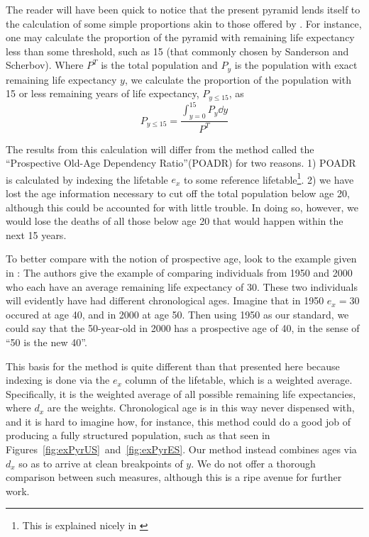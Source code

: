 \FloatBarrier
\label{sec:exageing}
The reader will have been quick to notice that the present pyramid lends itself
to the calculation of some simple proportions akin to those offered by
\citet[e.g.][]{sanderson2005average}. For instance, one may calculate the
proportion of the pyramid with remaining life expectancy less than some
threshold, such as 15 (that commonly chosen by Sanderson and Scherbov). Where
$P^T$ is the total population and $P_y$ is the population with exact remaining
life expectancy $y$, we calculate the proportion of the population with 15 or
less remaining years of life expectancy, $P_{y \le 15}$, as
\begin{equation}
P_{y \le 15} = \frac{\int _{y=0}^{15} P_y \dd y}{P^T}
\end{equation}

The results from this calculation will differ from the method called the
``Prospective Old-Age Dependency Ratio''(POADR) for two reasons. 1) POADR is
calculated by indexing the lifetable $e_x$ to some reference
lifetable\footnote{This is explained nicely in \citet{sanderson2007new}}. 2)
we have lost the age information necessary to cut off the total population
below age 20, although this could be accounted for with little trouble. In
doing so, however, we would lose the deaths of all those below age 20 that
would happen within the next 15 years. 

To better compare with the notion of prospective age, look to the example given
in \citet{sanderson2007new}: The authors give the example of comparing
individuals from 1950 and 2000 who each have an average remaining life 
expectancy of 30. These two individuals will 
evidently have had different chronological ages. Imagine that in 1950 $e_x = 30$ 
occured at age 40, and in 2000 at age 50. Then using 1950 as our standard, we 
could say that the 50-year-old in 2000 has a prospective age of 40, in the sense
of ``50 is the new 40''. 

This basis for the method is quite different than that presented here because
indexing is done via the $e_x$ column of the lifetable, which is a weighted
average. Specifically, it is the weighted average of all possible remaining life
expectancies, where $d_x$ are the weights. Chronological age is in this way
never dispensed with, and it is hard to imagine how, for instance, this method
could do a good job of producing a fully structured population, such as that
seen in Figures~\ref{fig:exPyrUS}~and~\ref{fig:exPyrES}. Our method instead
combines ages via $d_x$ so as to arrive at clean breakpoints of $y$. We do not
offer a thorough comparison between such measures, although this is a ripe
avenue for further work.

